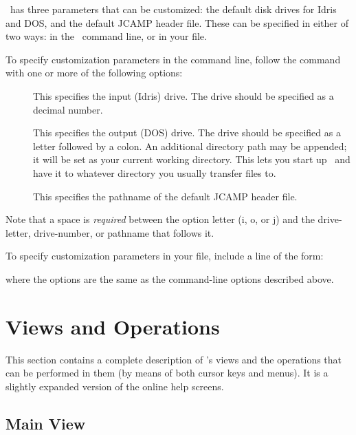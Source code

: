 \RD\ has three parameters that can be customized:  the default disk
drives for Idris and DOS, and the default JCAMP header file.
These can be specified in either of two ways: in the \RD\ command line,
or in your  file.

To specify customization parameters in the command line,
follow the command  with one or more of the following
options:

\begin{description}

\item[ ] \nl
This specifies the input (Idris) drive.  The drive should be specified
as a decimal number.

\item[ ] \nl
This specifies the output (DOS) drive.  The drive should be specified
as a letter followed by a colon.  An additional directory path may be
appended; it will be set as your current working directory.  This lets
you start up \RD\ and have it  to whatever directory you
usually transfer files to.

\item[ ] \nl
This specifies the pathname of the default JCAMP header file.

\end{description}
\noindent Note that a space is {\em required} between the option
letter (i, o, or j) and the drive-letter, drive-number, or pathname
that follows it.

To specify customization parameters in your  file,
include a line of the form:
\begin{quote}
 
\end{quote}

\noindent where the options are the same as the command-line options
described above.


\chapter{Views and Operations}
 
This section contains a complete description of \RD's views and the
operations that can be performed in them (by means of both cursor keys
and menus).  It is a slightly expanded version of the online
help screens.


 
\section{Main View}

